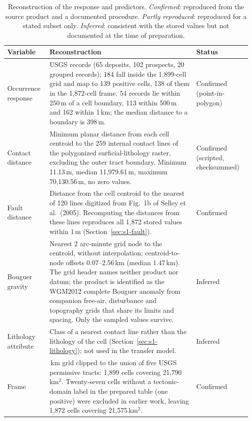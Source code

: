 \documentclass[11pt]{article}
\begin{document}
\begin{table}[ht]
\centering
\small
\caption{Reconstruction of the response and predictors. \emph{Confirmed}: reproduced from the source product and a documented procedure. \emph{Partly reproduced}: reproduced for a stated subset only. \emph{Inferred}: consistent with the stored values but not documented at the time of preparation.}
\label{tab:s1}
\begin{tabular}{>{\raggedright\arraybackslash}p{}>{\raggedright\arraybackslash}p{}>{\raggedright\arraybackslash}p{}}
\toprule
Variable & Reconstruction & Status \\
\midrule
Occurrence response & 187 USGS records (65 deposits, 102 prospects, 20 grouped records); 184 fall inside the 1,899-cell grid and map to 139 positive cells, 138 of them in the 1,872-cell frame. 54 records lie within 250\,m of a cell boundary, 113 within 500\,m and 162 within 1\,km; the median distance to a boundary is 398\,m. & Confirmed (point-in-polygon) \\
\addlinespace
Contact distance & Minimum planar distance from each cell centroid to the 259 internal contact lines of the polygonized surficial-lithology raster, excluding the outer tract boundary. Minimum 11.13\,m, median 11,979.61\,m, maximum 70,130.56\,m, no zero values. & Confirmed (scripted, checksummed) \\
\addlinespace
Fault distance & Distance from the cell centroid to the nearest of 120 lines digitized from Fig.~1b of Selley et al.\ (2005). Recomputing the distances from these lines reproduces all 1,872 stored values within 1\,m (Section~\ref{sec:s1-fault}). & Confirmed \\
\addlinespace
Bouguer gravity & Nearest 2 arc-minute grid node to the centroid, without interpolation; centroid-to-node offsets 0.07--2.56\,km (median 1.47\,km). The grid header names neither product nor datum; the product is identified as the WGM2012 complete Bouguer anomaly from companion free-air, disturbance and topography grids that share its limits and spacing. Only the sampled values survive. & Inferred \\
\addlinespace
Lithology attribute & Class of a nearest contact line rather than the lithology of the cell (Section~\ref{sec:s1-lithology}); not used in the transfer model. & Inferred \\
\addlinespace
Frame & 5\,km grid clipped to the union of five USGS permissive tracts: 1,899 cells covering 21,790\,km$^2$. Twenty-seven cells without a tectonic-domain label in the prepared table (one positive) were excluded in earlier work, leaving 1,872 cells covering 21,575\,km$^2$. & Confirmed \\
\bottomrule
\end{tabular}
\end{table}
\end{document}
